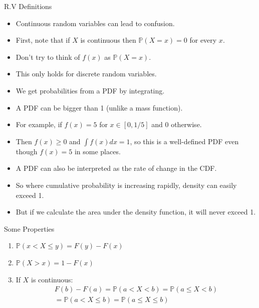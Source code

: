 \documentclass[handout]{beamer}
\begin{document}
\begin{frame}{R.V Definitions}
\scriptsize{
\begin{itemize}
 \item Continuous random variables can lead to confusion. 
 \item First, note that if $X$ is continuous then $\mathbb{P}(X = x) = 0$ for every $x$. 
\item Don't try to think of $f(x)$ as $\mathbb{P}(X = x)$. 
\item This only holds for discrete random variables. 
\item We get probabilities from a PDF by integrating. 
\item A PDF can be bigger than 1 (unlike a mass function). 
\item For example, if $f(x) = 5$ for $x \in  [0,1/5]$ and $0$ otherwise.
\item Then $f(x) \geq 0$ and $\int f(x)dx = 1$, so this is a well-defined PDF even though $f(x) = 5$ in some places.
\item A PDF can also be interpreted as the rate of change in the CDF. 
\item So where cumulative probability is increasing rapidly, density can easily exceed 1. 
\item But if we calculate the area under the density function, it will never exceed 1. 
 
\end{itemize}




}
\end{frame}



\begin{frame}{Some Properties}

\begin{enumerate}
 \item $ \mathbb{P}( x < X \leq y) = F(y) - F(x)$
       

\item $ \mathbb{P}(X > x) = 1 - F(x)$ 

\item If $X$ is continuous: 
\begin{eqnarray*}
 F(b) - F(a) = \mathbb{P}(a < X < b) = \mathbb{P} ( a \leq X < b)  \\
   = \mathbb{P} ( a < X \leq b) = \mathbb{P} ( a \leq X \leq b) 
\end{eqnarray*}

\end{enumerate}



 
\end{frame}
\end{document}

